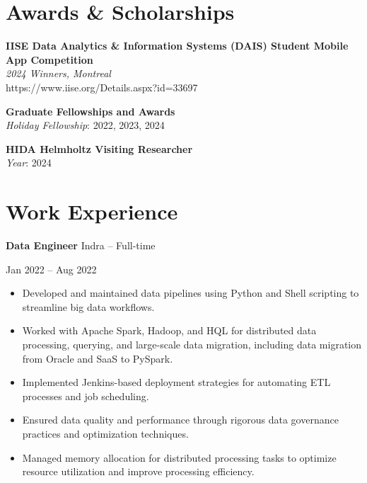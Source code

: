 \documentclass[10pt, letterpaper]{article}
\newenvironment{highlights}{
    \begin{itemize}[
        topsep=0.10 cm,
        parsep=0.10 cm,
        partopsep=0pt,
        itemsep=0pt,
        leftmargin=0 cm + 10pt
    ]
}{
    \end{itemize}
} %
\newenvironment{twocolentry}[2][]{
    \onecolentry
    \def\secondColumn{#2}
    \setcolumnwidth{\fill, 4.5 cm}
    \begin{paracol}{2}
}{
    \switchcolumn \raggedleft \secondColumn
    \end{paracol}
    \endonecolentry
} %
\begin{document}
        \section*{Awards \& Scholarships}

        \noindent \textbf{IISE Data Analytics \& Information Systems (DAIS) Student Mobile App Competition} \\
        \textit{2024 Winners, Montreal} \\
        
        https://www.iise.org/Details.aspx?id=33697
        
        \vspace{0.5em} %
        
        \noindent \textbf{Graduate Fellowships and Awards} \\
        \textit{Holiday Fellowship}: 2022, 2023, 2024 \\
        
        \vspace{0.5em} %
        
        \noindent \textbf{HIDA Helmholtz Visiting Researcher} \\
        \textit{Year}: 2024

        
\section*{Work Experience}

\begin{twocolentry}{Jan 2022 – Aug 2022}
    \textbf{Data Engineer} \textbar Indra – Full-time
\end{twocolentry}
\begin{highlights}
    \item Developed and maintained data pipelines using Python and Shell scripting to streamline big data workflows.
    \item Worked with Apache Spark, Hadoop, and HQL for distributed data processing, querying, and large-scale data migration, including data migration from Oracle and SaaS to PySpark.
    \item Implemented Jenkins-based deployment strategies for automating ETL processes and job scheduling.
    \item Ensured data quality and performance through rigorous data governance practices and optimization techniques.
    \item Managed memory allocation for distributed processing tasks to optimize resource utilization and improve processing efficiency.
\end{highlights}
\end{document}
